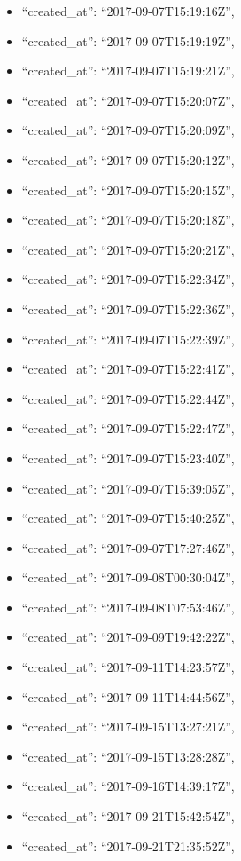 \begin{itemize}
\item
  ``created\_at'': ``2017-09-07T15:19:16Z'',
\item
  ``created\_at'': ``2017-09-07T15:19:19Z'',
\item
  ``created\_at'': ``2017-09-07T15:19:21Z'',
\item
  ``created\_at'': ``2017-09-07T15:20:07Z'',
\item
  ``created\_at'': ``2017-09-07T15:20:09Z'',
\item
  ``created\_at'': ``2017-09-07T15:20:12Z'',
\item
  ``created\_at'': ``2017-09-07T15:20:15Z'',
\item
  ``created\_at'': ``2017-09-07T15:20:18Z'',
\item
  ``created\_at'': ``2017-09-07T15:20:21Z'',
\item
  ``created\_at'': ``2017-09-07T15:22:34Z'',
\item
  ``created\_at'': ``2017-09-07T15:22:36Z'',
\item
  ``created\_at'': ``2017-09-07T15:22:39Z'',
\item
  ``created\_at'': ``2017-09-07T15:22:41Z'',
\item
  ``created\_at'': ``2017-09-07T15:22:44Z'',
\item
  ``created\_at'': ``2017-09-07T15:22:47Z'',
\item
  ``created\_at'': ``2017-09-07T15:23:40Z'',
\item
  ``created\_at'': ``2017-09-07T15:39:05Z'',
\item
  ``created\_at'': ``2017-09-07T15:40:25Z'',
\item
  ``created\_at'': ``2017-09-07T17:27:46Z'',
\item
  ``created\_at'': ``2017-09-08T00:30:04Z'',
\item
  ``created\_at'': ``2017-09-08T07:53:46Z'',
\item
  ``created\_at'': ``2017-09-09T19:42:22Z'',
\item
  ``created\_at'': ``2017-09-11T14:23:57Z'',
\item
  ``created\_at'': ``2017-09-11T14:44:56Z'',
\item
  ``created\_at'': ``2017-09-15T13:27:21Z'',
\item
  ``created\_at'': ``2017-09-15T13:28:28Z'',
\item
  ``created\_at'': ``2017-09-16T14:39:17Z'',
\item
  ``created\_at'': ``2017-09-21T15:42:54Z'',
\item
  ``created\_at'': ``2017-09-21T21:35:52Z'',

\end{itemize}
